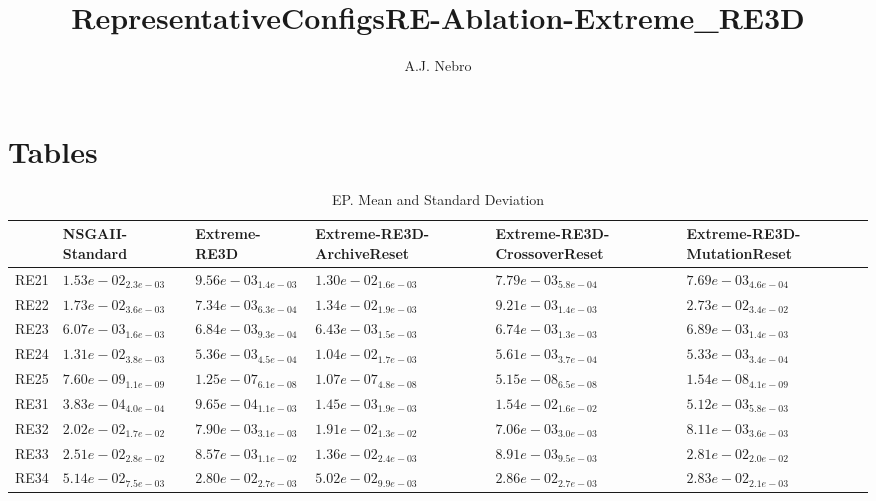 \documentclass{article}
\title{RepresentativeConfigsRE-Ablation-Extreme_RE3D}
\author{A.J. Nebro}
\begin{document}
\maketitle
\section{Tables}

\begin{table}
\caption{EP. Mean and Standard Deviation}
\label{table: EP}
\centering
\begin{scriptsize}
\begin{tabular}{llllll}
\hline & NSGAII-Standard & Extreme-RE3D & Extreme-RE3D-ArchiveReset & Extreme-RE3D-CrossoverReset &  Extreme-RE3D-MutationReset\\
\hline 
RE21 & $  1.53e-02_{ 2.3e-03}$ & $  9.56e-03_{ 1.4e-03}$ & $  1.30e-02_{ 1.6e-03}$ & \cellcolor{gray25}$  7.79e-03_{ 5.8e-04}$ & \cellcolor{gray95}$  7.69e-03_{ 4.6e-04}$ \\
RE22 & $  1.73e-02_{ 3.6e-03}$ & \cellcolor{gray95}$  7.34e-03_{ 6.3e-04}$ & $  1.34e-02_{ 1.9e-03}$ & \cellcolor{gray25}$  9.21e-03_{ 1.4e-03}$ & $  2.73e-02_{ 3.4e-02}$ \\
RE23 & \cellcolor{gray95}$  6.07e-03_{ 1.6e-03}$ & $  6.84e-03_{ 9.3e-04}$ & \cellcolor{gray25}$  6.43e-03_{ 1.5e-03}$ & $  6.74e-03_{ 1.3e-03}$ & $  6.89e-03_{ 1.4e-03}$ \\
RE24 & $  1.31e-02_{ 3.8e-03}$ & \cellcolor{gray25}$  5.36e-03_{ 4.5e-04}$ & $  1.04e-02_{ 1.7e-03}$ & $  5.61e-03_{ 3.7e-04}$ & \cellcolor{gray95}$  5.33e-03_{ 3.4e-04}$ \\
RE25 & \cellcolor{gray95}$  7.60e-09_{ 1.1e-09}$ & $  1.25e-07_{ 6.1e-08}$ & $  1.07e-07_{ 4.8e-08}$ & $  5.15e-08_{ 6.5e-08}$ & \cellcolor{gray25}$  1.54e-08_{ 4.1e-09}$ \\
RE31 & \cellcolor{gray95}$  3.83e-04_{ 4.0e-04}$ & \cellcolor{gray25}$  9.65e-04_{ 1.1e-03}$ & $  1.45e-03_{ 1.9e-03}$ & $  1.54e-02_{ 1.6e-02}$ & $  5.12e-03_{ 5.8e-03}$ \\
RE32 & $  2.02e-02_{ 1.7e-02}$ & \cellcolor{gray25}$  7.90e-03_{ 3.1e-03}$ & $  1.91e-02_{ 1.3e-02}$ & \cellcolor{gray95}$  7.06e-03_{ 3.0e-03}$ & $  8.11e-03_{ 3.6e-03}$ \\
RE33 & $  2.51e-02_{ 2.8e-02}$ & \cellcolor{gray95}$  8.57e-03_{ 1.1e-02}$ & $  1.36e-02_{ 2.4e-03}$ & \cellcolor{gray25}$  8.91e-03_{ 9.5e-03}$ & $  2.81e-02_{ 2.0e-02}$ \\
RE34 & $  5.14e-02_{ 7.5e-03}$ & \cellcolor{gray95}$  2.80e-02_{ 2.7e-03}$ & $  5.02e-02_{ 9.9e-03}$ & $  2.86e-02_{ 2.7e-03}$ & \cellcolor{gray25}$  2.83e-02_{ 2.1e-03}$ \\

\end{tabular}
\end{scriptsize}
\end{table}
\end{document}
